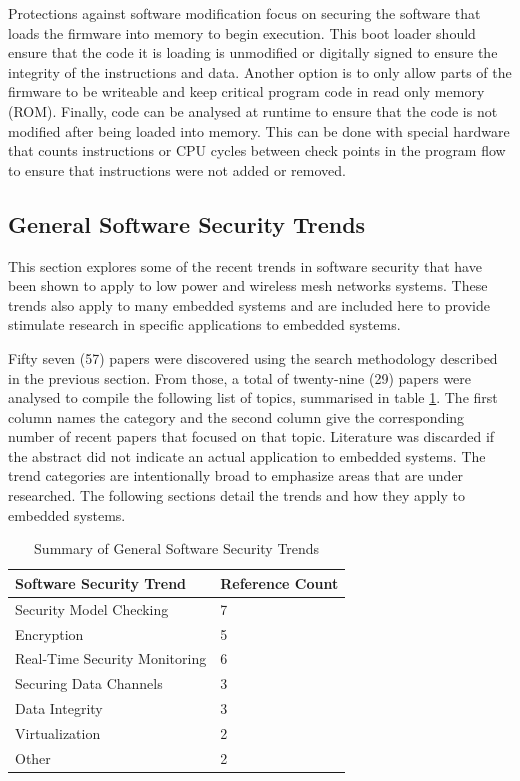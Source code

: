 \documentclass[final,conference,11pt]{IEEEtran}
\begin{document}
Protections against software modification focus on securing the software that loads the firmware into memory to begin execution.  This boot loader should ensure that the code it is loading is unmodified or digitally signed to ensure the integrity of the instructions and data. Another option is to only allow parts of the firmware to be writeable and keep critical program code in read only memory (ROM). Finally, code can be analysed at runtime to ensure that the code is not modified after being loaded into memory.  This can be done with special hardware that counts instructions or CPU cycles between check points in the program flow to ensure that instructions were not added or removed. \cite{compiler-hw approach,fpga-based}

\subsection{General Software Security Trends}

This section explores some of the recent trends in software security that have been shown to apply to low power and wireless mesh networks systems. These trends also apply to many embedded systems and are included here to provide stimulate research in specific applications to embedded systems.

Fifty seven (57) papers were discovered using the search methodology described in the previous section.  From those, a total of twenty-nine (29) papers were analysed to compile the following list of topics, summarised in table \ref{tab:trend_summary}.  The first column names the category and the second column give the corresponding number of recent papers that focused on that topic. Literature was discarded if the abstract did not indicate an actual application to embedded systems.  The trend categories are intentionally broad to emphasize areas that are under researched. The following sections detail  the trends and how they apply to embedded systems.

\begin{table}[!t]
\renewcommand{\arraystretch}{1.3}
\caption{Summary of General Software Security Trends}
\label{tab:trend_summary}
\centering
\begin{tabular}{ | l | l | }
\hline
 Software Security Trend & Reference Count \\ \hline
 Security Model Checking			& 7	\\ \hline
 Encryption						& 5	\\ \hline
 Real-Time Security Monitoring	& 6	\\ \hline
 Securing Data Channels			& 3	\\ \hline
 Data Integrity					& 3	\\ \hline
 Virtualization					& 2	\\ \hline	
 Other							& 2	\\ \hline
\end{tabular}
\end{table}
\end{document}
